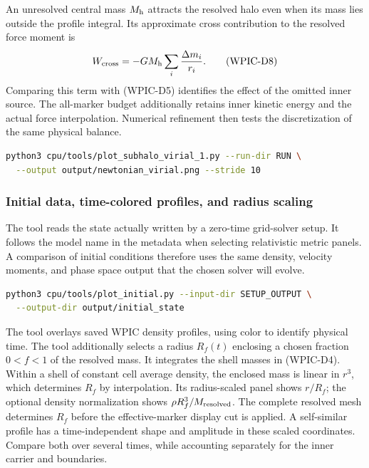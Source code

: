 An unresolved central mass \(M_{\rm h}\) attracts the resolved halo even
when its mass lies outside the profile integral. Its approximate cross
contribution to the resolved force moment is
\[
 W_{\rm cross}=-G M_{\rm h}\sum_i\frac{\Delta m_i}{r_i}. \tag{WPIC-D8}
\]
Comparing this term with (WPIC-D5) identifies the effect of the omitted inner
source. The all-marker budget additionally retains inner kinetic energy
and the actual force interpolation. Numerical refinement then tests the
discretization of the same physical balance.

\begin{lstlisting}[language=bash]
python3 cpu/tools/plot_subhalo_virial_1.py --run-dir RUN \
  --output output/newtonian_virial.png --stride 10
\end{lstlisting}

\subsubsection{Initial data, time-colored profiles, and radius scaling}

The tool  reads the state actually written
by a zero-time grid-solver setup. It follows the model name in the metadata
when selecting relativistic metric panels. A comparison of initial conditions
therefore uses the same density, velocity moments, and phase space output
that the chosen solver will evolve.

\begin{lstlisting}[language=bash]
python3 cpu/tools/plot_initial.py --input-dir SETUP_OUTPUT \
  --output-dir output/initial_state
\end{lstlisting}

The tool  overlays saved WPIC density
profiles, using color to identify physical time. The tool
\path{cpu/tools/plot_wpic_scaled_profiles.py} additionally selects a radius
\(R_f(t)\) enclosing a chosen fraction \(0<f<1\) of the resolved mass.
It integrates the shell masses in (WPIC-D4). Within a shell of constant cell
average density, the enclosed mass is linear in \(r^3\), which determines
\(R_f\) by interpolation. Its radius-scaled panel shows
\(r/R_f\); the optional density normalization shows
\(\rho R_f^3/M_{\rm resolved}\). The complete resolved mesh determines
\(R_f\) before the effective-marker display cut is applied. A self-similar profile has a time-independent shape and amplitude in these
scaled coordinates. Compare both over several times, while accounting
separately for the inner carrier and boundaries.

